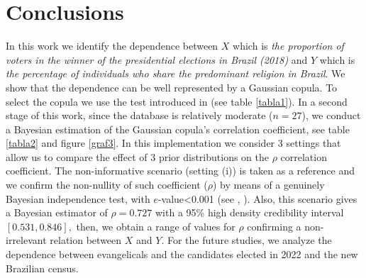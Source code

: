 \documentclass{aip-cp}
\begin{document}



\section{Conclusions}\label{conclu}
In this work we identify the dependence between $X$ which is {\it{the proportion of voters in the winner of the presidential elections in Brazil (2018)}} and $Y$ which is {\it{the percentage of individuals who share the predominant religion in Brazil}}. We show that the dependence can be well represented by a Gaussian copula. To select the copula we use the test introduced in \cite{genest} (see table \ref{tabla1}). In a second stage of this work, since the database is relatively moderate ($n=27$), we conduct a Bayesian estimation of the Gaussian copula's correlation coefficient, see table \ref{tabla2} and figure \ref{graf3}. In this implementation we consider 3 settings that allow us to compare the effect of 3 prior distributions on the $\rho$ correlation coefficient. The non-informative scenario (setting (i)) is taken as a reference and we confirm the non-nullity of such coefficient ($\rho$) by means of a genuinely Bayesian independence test, with $e$-value<0.001 (see \cite{pereira}, \cite{madruga}). Also, this scenario gives a Bayesian estimator of $\rho= 0.727$  with a 95\% high density credibility interval $[0.531, 0.846],$ then, we obtain a range of values for $\rho$ confirming a non-irrelevant relation between $X$ and $Y.$ For the future studies, we analyze the dependence between evangelicals and the candidates elected in 2022 and the new Brazilian census.
\end{document}
